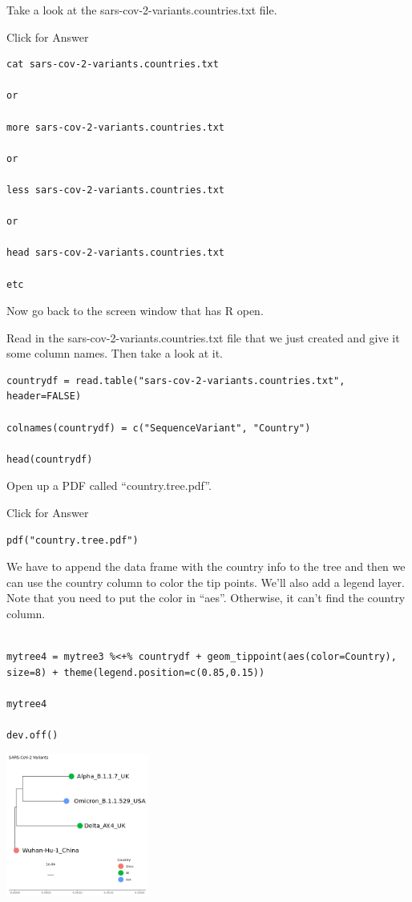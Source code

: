 \documentclass[
]{book}
\begin{document}
Take a look at the sars-cov-2-variants.countries.txt file.

Click for Answer

\begin{verbatim}
cat sars-cov-2-variants.countries.txt

or 

more sars-cov-2-variants.countries.txt

or

less sars-cov-2-variants.countries.txt

or

head sars-cov-2-variants.countries.txt

etc
\end{verbatim}

\hfill\break

Now go back to the screen window that has R open.

Read in the sars-cov-2-variants.countries.txt file that we just created and give it some column names. Then take a look at it.

\begin{verbatim}
countrydf = read.table("sars-cov-2-variants.countries.txt", header=FALSE)

colnames(countrydf) = c("SequenceVariant", "Country")

head(countrydf)
\end{verbatim}

Open up a PDF called ``country.tree.pdf''.

Click for Answer

\begin{verbatim}
pdf("country.tree.pdf")
\end{verbatim}

\hfill\break

We have to append the data frame with the country info to the tree and then we can use the country column to color the tip points. We'll also add a legend layer. Note that you need to put the color in ``aes''. Otherwise, it can't find the country column.

\begin{verbatim}

mytree4 = mytree3 %<+% countrydf + geom_tippoint(aes(color=Country), size=8) + theme(legend.position=c(0.85,0.15))

mytree4

dev.off()
\end{verbatim}

\includegraphics[width=0.35\textwidth,height=\textheight]{./Figures/country.tree.png}
\end{document}
